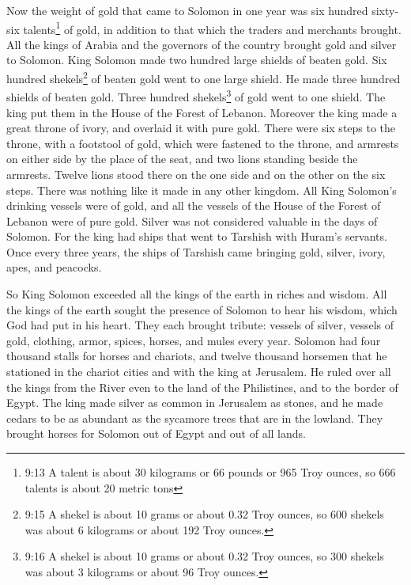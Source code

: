\myverse{}Now the weight of gold that came to Solomon in one year was six
hundred sixty-six talents\footnote{9:13 A talent is about 30 kilograms or 66 pounds or 965 Troy ounces, so 666 talents is about 20 metric
	tons} of gold,
\myverse{}in addition to that which the traders and merchants brought. All the kings
of Arabia and the governors of the country brought gold and silver to Solomon.
\myverse{}King Solomon made two hundred large shields of beaten gold. Six hundred shekels\footnote{9:15 A shekel is about 10 grams or about 0.32 Troy ounces, so 600 shekels was about 6 kilograms or
	about 192 Troy ounces.} of beaten gold went to one large shield.
\myverse{}He made three hundred shields of beaten gold. Three hundred shekels\footnote{9:16 A shekel is about 10 grams or about 0.32 Troy ounces, so 300 shekels was about 3 kilograms or
	about 96 Troy ounces.} of gold went to one shield. The king put them in the House of the Forest
of Lebanon.
\myverse{}Moreover the king made a great throne of ivory, and overlaid it with pure
gold.
\myverse{}There were six steps to the throne, with a footstool of gold, which were fastened
to the throne, and armrests on either side by the place of the seat, and two lions standing beside the
armrests.
\myverse{}Twelve lions stood there on the one side and on the other on the six steps.
There was nothing like it made in any other kingdom.
\myverse{}All King Solomon’s drinking vessels were of gold, and all the vessels of the
House of the Forest of Lebanon were of pure gold. Silver was not considered valuable in the days of Solomon.
\myverse{}For the king had ships that went to Tarshish with Huram’s servants. Once every
three years, the ships of Tarshish came bringing gold, silver, ivory, apes, and peacocks.

\myverse{}So King Solomon exceeded all the kings of the earth in riches
and wisdom.
\myverse{}All the kings of the earth sought the presence of Solomon to hear his wisdom,
which God had put in his heart.
\myverse{}They each brought tribute: vessels of silver, vessels of gold, clothing, armor,
spices, horses, and mules every year.
\myverse{}Solomon had four thousand stalls for horses and chariots, and twelve thousand
horsemen that he stationed in the chariot cities and with the king at Jerusalem.
\myverse{}He ruled over all the kings from the River even to the land of the Philistines,
and to the border of Egypt.
\myverse{}The king made silver as common in Jerusalem as stones, and he made cedars
to be as abundant as the sycamore trees that are in the lowland.
\myverse{}They brought horses for Solomon out of Egypt and out of all lands.


